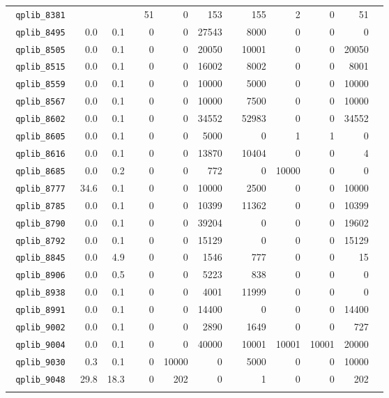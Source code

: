 {\begin{longtable}{lrrrrrrrrrrrr}
\texttt{ 	qplib\_8381	}	&		&		&	&	51	&	0	&	153	&	&	155	&	2	&	0	&	51	\\
\texttt{ 	qplib\_8495	}	&	0.0	&	0.1	&	&	0	&	0	&	27543	&	&	8000	&	0	&	0	&	0	\\
\texttt{ 	qplib\_8505	}	&	0.0	&	0.1	&	&	0	&	0	&	20050	&	&	10001	&	0	&	0	&	20050	\\
\texttt{ 	qplib\_8515	}	&	0.0	&	0.1	&	&	0	&	0	&	16002	&	&	8002	&	0	&	0	&	8001	\\
\texttt{ 	qplib\_8559	}	&	0.0	&	0.1	&	&	0	&	0	&	10000	&	&	5000	&	0	&	0	&	10000	\\
\texttt{ 	qplib\_8567	}	&	0.0	&	0.1	&	&	0	&	0	&	10000	&	&	7500	&	0	&	0	&	10000	\\
\texttt{ 	qplib\_8602	}	&	0.0	&	0.1	&	&	0	&	0	&	34552	&	&	52983	&	0	&	0	&	34552	\\
\texttt{ 	qplib\_8605	}	&	0.0	&	0.1	&	&	0	&	0	&	5000	&	&	0	&	1	&	1	&	0	\\
\texttt{ 	qplib\_8616	}	&	0.0	&	0.1	&	&	0	&	0	&	13870	&	&	10404	&	0	&	0	&	4	\\
\texttt{ 	qplib\_8685	}	&	0.0	&	0.2	&	&	0	&	0	&	772	&	&	0	&	10000	&	0	&	0	\\
\texttt{ 	qplib\_8777	}	&	34.6	&	0.1	&	&	0	&	0	&	10000	&	&	2500	&	0	&	0	&	10000	\\
\texttt{ 	qplib\_8785	}	&	0.0	&	0.1	&	&	0	&	0	&	10399	&	&	11362	&	0	&	0	&	10399	\\
\texttt{ 	qplib\_8790	}	&	0.0	&	0.1	&	&	0	&	0	&	39204	&	&	0	&	0	&	0	&	19602	\\
\texttt{ 	qplib\_8792	}	&	0.0	&	0.1	&	&	0	&	0	&	15129	&	&	0	&	0	&	0	&	15129	\\
\texttt{ 	qplib\_8845	}	&	0.0	&	4.9	&	&	0	&	0	&	1546	&	&	777	&	0	&	0	&	15	\\
\texttt{ 	qplib\_8906	}	&	0.0	&	0.5	&	&	0	&	0	&	5223	&	&	838	&	0	&	0	&	0	\\
\texttt{ 	qplib\_8938	}	&	0.0	&	0.1	&	&	0	&	0	&	4001	&	&	11999	&	0	&	0	&	0	\\
\texttt{ 	qplib\_8991	}	&	0.0	&	0.1	&	&	0	&	0	&	14400	&	&	0	&	0	&	0	&	14400	\\
\texttt{ 	qplib\_9002	}	&	0.0	&	0.1	&	&	0	&	0	&	2890	&	&	1649	&	0	&	0	&	727	\\
\texttt{ 	qplib\_9004	}	&	0.0	&	0.1	&	&	0	&	0	&	40000	&	&	10001	&	10001	&	10001	&	20000	\\
\texttt{ 	qplib\_9030	}	&	0.3	&	0.1	&	&	0	&	10000	&	0	&	&	5000	&	0	&	0	&	10000	\\
\texttt{ 	qplib\_9048	}	&	29.8	&	18.3	&	&	0	&	202	&	0	&	&	1	&	0	&	0	&	202	\\


\bottomrule

\label{tab:A1}

\end{longtable}

}




